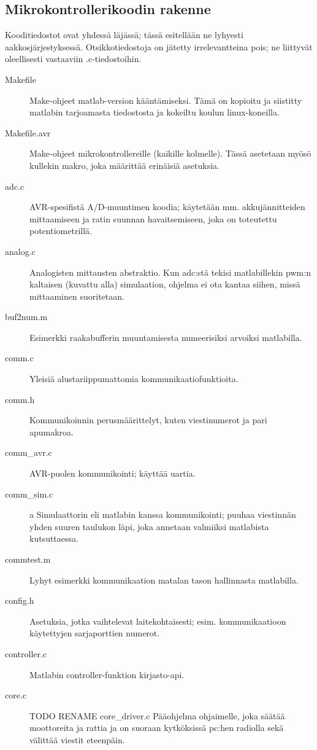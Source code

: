 \documentclass{article}
\begin{document}
\clearpage
\begin{appendices}

\section{Mikrokontrollerikoodin rakenne} \label{app:mcucode}

Kooditiedostot ovat yhdessä läjässä; tässä esitellään ne lyhyesti aakkosjärjestyksessä. Otsikkotiedostoja on jätetty irrelevantteina pois; ne liittyvät oleellisesti vastaaviin .c-tiedostoihin.

\begin{description}
\item[Makefile] Make-ohjeet matlab-version kääntämiseksi. Tämä on kopioitu ja siistitty matlabin tarjoamasta tiedostosta ja kokeiltu koulun linux-koneilla.
\item[Makefile.avr] Make-ohjeet mikrokontrollereille (kaikille kolmelle). Tässä asetetaan myösö kullekin makro, joka määrittää erinäisiä asetuksia.
\item[adc.c] AVR-spesifistä A/D-muuntimen koodia; käytetään mm. akkujännitteiden mittaamiseen ja ratin suunnan havaitsemiseen, joka on toteutettu potentiometrillä.
\item[analog.c] Analogisten mittausten abstraktio. Kun adc:stä tekisi matlabillekin pwm:n kaltaisen (kuvattu alla) simulaation, ohjelma ei ota kantaa siihen, missä mittaaminen suoritetaan.
\item[buf2num.m] Esimerkki raakabufferin muuntamisesta numeerisiksi arvoiksi matlabilla.
\item[comm.c] Yleisiä alustariippumattomia kommunikaatiofunktioita.
\item[comm.h] Kommunikoinnin perusmäärittelyt, kuten viestinumerot ja pari apumakroa.
\item[comm\_avr.c] AVR-puolen kommunikointi; käyttää uartia.
\item[comm\_sim.c]a Simulaattorin eli matlabin kanssa kommunikointi; puuhaa viestinnän yhden suuren taulukon läpi, joka annetaan valmiiksi matlabista kutsuttaessa.
\item[commtest.m] Lyhyt esimerkki kommunikaation matalan tason hallinnasta matlabilla.
\item[config.h] Asetuksia, jotka vaihtelevat laitekohtaisesti; esim. kommunikaatioon käytettyjen sarjaporttien numerot.
\item[controller.c] Matlabin controller-funktion kirjasto-api.
\item[core.c] TODO RENAME core\_driver.c Pääohjelma ohjaimelle, joka säätää moottoreita ja rattia ja on suoraan kytköksissä pc:hen radiolla sekä välittää viestit eteenpäin.

\end{description}
\end{appendices}
\end{document}

